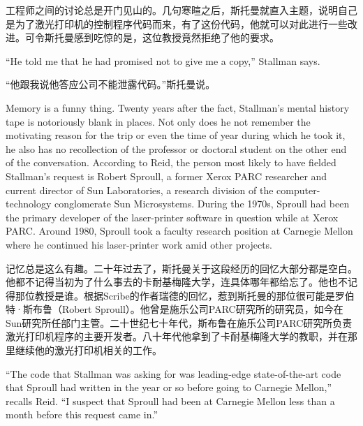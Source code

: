 \ifdefined\chs
工程师之间的讨论总是开门见山的。几句寒暄之后，斯托曼就直入主题，说明自己是为了激光打印机的控制程序代码而来，有了这份代码，他就可以对此进行一些改进。可令斯托曼感到吃惊的是，这位教授竟然拒绝了他的要求。
\fi

\ifdefined\eng
``He told me that he had promised not to give me a copy,'' Stallman says.
\fi

\ifdefined\chs
``他跟我说他答应公司不能泄露代码。''斯托曼说。
\fi

\ifdefined\eng
Memory is a funny thing. Twenty years after the fact, Stallman's mental history tape is notoriously blank in places. Not only does he not remember the motivating reason for the trip or even the time of year during which he took it, he also has no recollection of the professor or doctoral student on the other end of the conversation. According to Reid, the person most likely to have fielded Stallman's request is Robert Sproull, a former Xerox PARC researcher and current director of Sun Laboratories, a research division of the computer-technology conglomerate Sun Microsystems. During the 1970s, Sproull had been the primary developer of the laser-printer software in question while at Xerox PARC. Around 1980, Sproull took a faculty research position at Carnegie Mellon where he continued his laser-printer work amid other projects.
\fi

\ifdefined\chs
记忆总是这么有趣。二十年过去了，斯托曼关于这段经历的回忆大部分都是空白。他都不记得当初为了什么事去的卡耐基梅隆大学，连具体哪年都给忘了。他也不记得那位教授是谁。根据Scribe的作者瑞德的回忆，惹到斯托曼的那位很可能是罗伯特·斯布鲁（Robert Sproull）。他曾是施乐公司PARC研究所的研究员，如今在Sun研究所任部门主管。二十世纪七十年代，斯布鲁在施乐公司PARC研究所负责激光打印机程序的主要开发者。八十年代他拿到了卡耐基梅隆大学的教职，并在那里继续他的激光打印机相关的工作。
\fi



\ifdefined\eng
``The code that Stallman was asking for was leading-edge state-of-the-art code that Sproull had written in the year or so before going to Carnegie Mellon,'' recalls Reid. ``I suspect that Sproull had been at Carnegie Mellon less than a month before this request came in.''
\fi

